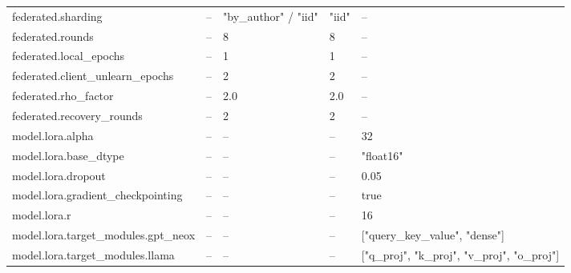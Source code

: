 {\begin{longtable}{@{\extracolsep{\fill}}lllll@{}}
federated.sharding & -- & "by\_author" / "iid" & "iid" & -- \\
federated.rounds & -- & 8 & 8 & -- \\
federated.local\_epochs & -- & 1 & 1 & -- \\
federated.client\_unlearn\_epochs & -- & 2 & 2 & -- \\
federated.rho\_factor & -- & 2.0 & 2.0 & -- \\
federated.recovery\_rounds & -- & 2 & 2 & -- \\
model.lora.alpha & -- & -- & -- & 32 \\
model.lora.base\_dtype & -- & -- & -- & "float16" \\
model.lora.dropout & -- & -- & -- & 0.05 \\
model.lora.gradient\_checkpointing & -- & -- & -- & true \\
model.lora.r & -- & -- & -- & 16 \\
model.lora.target\_modules.gpt\_neox & -- & -- & -- & ["query\_key\_value", "dense"] \\
model.lora.target\_modules.llama & -- & -- & -- & ["q\_proj", "k\_proj", "v\_proj", "o\_proj"] \\
\end{longtable}
}
